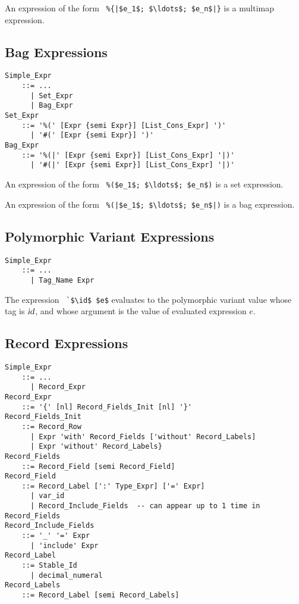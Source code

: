 An expression of the form ~\lstinline!%{|$e_1$; $\ldots$; $e_n$|}! is a multimap expression. 






\subsection{Bag Expressions}
\label{sec:bag-expressions}

\grammar\begin{lstlisting}
Simple_Expr 
    ::= ...
      | Set_Expr
      | Bag_Expr
Set_Expr
    ::= '%(' [Expr {semi Expr}] [List_Cons_Expr] ')'
      | '#(' [Expr {semi Expr}] ')'
Bag_Expr
    ::= '%(|' [Expr {semi Expr}] [List_Cons_Expr] '|)'
      | '#(|' [Expr {semi Expr}] [List_Cons_Expr] '|)'
\end{lstlisting}

An expression of the form ~\lstinline!%($e_1$; $\ldots$; $e_n$)! is a set expression. 

An expression of the form ~\lstinline!%(|$e_1$; $\ldots$; $e_n$|)! is a bag expression.





\subsection{Polymorphic Variant Expressions}
\label{sec:polymorphic-variant-expressions}

\grammar\begin{lstlisting}
Simple_Expr 
    ::= ...
      | Tag_Name Expr
\end{lstlisting}

The expression ~\lstinline!`$\id$ $e$! evaluates to the polymorphic variant value whose tag is $\mbox{\sl id}$, and whose argument is the value of evaluated expression $e$. 





\subsection{Record Expressions}
\label{sec:record-expressions}

\grammar\begin{lstlisting}
Simple_Expr
    ::= ...
      | Record_Expr
Record_Expr 
    ::= '{' [nl] Record_Fields_Init [nl] '}'
Record_Fields_Init
    ::= Record_Row
      | Expr 'with' Record_Fields ['without' Record_Labels]
      | Expr 'without' Record_Labels}
Record_Fields
    ::= Record_Field [semi Record_Field]
Record_Field
    ::= Record_Label [':' Type_Expr] ['=' Expr]
      | var_id
      | Record_Include_Fields  -- can appear up to 1 time in Record_Fields
Record_Include_Fields
    ::= '_' '=' Expr
      | 'include' Expr
Record_Label
    ::= Stable_Id
      | decimal_numeral
Record_Labels
    ::= Record_Label [semi Record_Labels]
\end{lstlisting}

